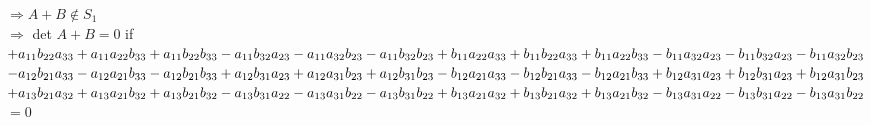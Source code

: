 \documentclass{article}
\begin{document}
$\Rightarrow A + B \notin S_1$\\

$\Rightarrow$ det $A + B = 0$ if\\
$+a_{11}b_{22}a_{33} +a_{11}a_{22}b_{33}
+a_{11}b_{22}b_{33}\\ -a_{11}b_{32}a_{23} -a_{11}a_{32}b_{23}
-a_{11}b_{32}b_{23}\\
+b_{11}a_{22}a_{33} +b_{11}b_{22}a_{33} +b_{11}a_{22}b_{33}\\
-b_{11}a_{32}a_{23} -b_{11}b_{32}a_{23} -b_{11}a_{32}b_{23}$\\

$-a_{12}b_{21}a_{33} -a_{12}a_{21}b_{33}
-a_{12}b_{21}b_{33}\\ +a_{12}b_{31}a_{23} +a_{12}a_{31}b_{23}
+a_{12}b_{31}b_{23}\\
-b_{12}a_{21}a_{33} -b_{12}b_{21}a_{33} -b_{12}a_{21}b_{33}
\\ +b_{12}a_{31}a_{23} +b_{12}b_{31}a_{23} +b_{12}a_{31}b_{23}$\\

$+a_{13}b_{21}a_{32} +a_{13}a_{21}b_{32}
+a_{13}b_{21}b_{32}\\ -a_{13}b_{31}a_{22} -a_{13}a_{31}b_{22}
-a_{13}b_{31}b_{22}\\
+b_{13}a_{21}a_{32} +b_{13}b_{21}a_{32} +b_{13}a_{21}b_{32}
\\ -b_{13}a_{31}a_{22} -b_{13}b_{31}a_{22} -b_{13}a_{31}b_{22}$\\
$= 0$
\end{document}
